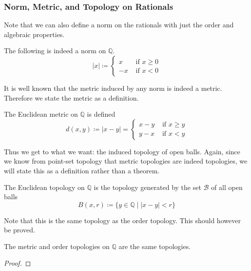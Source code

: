 \subsubsection{Norm, Metric, and Topology on Rationals}

  Note that we can also define a norm on the rationals with just the order and algebraic properties. 

  \begin{theorem} 
    The following is indeed a norm on $\mathbb{Q}$. 
    \begin{equation}
      |x| \coloneqq \begin{cases} x & \text{ if } x \geq 0 \\ -x & \text{ if } x < 0 \end{cases}
    \end{equation} 
  \end{theorem} 

  It is well known that the metric induced by any norm is indeed a metric. Therefore we state the metric as a definition. 

  \begin{definition}
    The Euclidean metric on $\mathbb{Q}$ is defined 
    \begin{equation}
      d(x, y) \coloneqq |x - y| = \begin{cases} x - y & \text{ if } x \geq y \\ y - x & \text{ if } x < y \end{cases}
    \end{equation}
  \end{definition}

  Thus we get to what we want: the induced topology of open balls. 
  Again, since we know from point-set topology that metric topologies are indeed topologies, we will state this as a definition rather than a theorem.  

  \begin{definition}
    The Euclidean topology on $\mathbb{Q}$ is the topology generated by the set $\mathscr{B}$ of all open balls
    \begin{equation}
      B(x, r) \coloneqq \{ y \in \mathbb{Q} \mid |x - y| < r \}
    \end{equation} 
  \end{definition}

  Note that this is the same topology as the order topology. This should however be proved. 

  \begin{theorem}
    The metric and order topologies on $\mathbb{Q}$ are the same topologies. 
  \end{theorem}
  \begin{proof}
    
  \end{proof}

